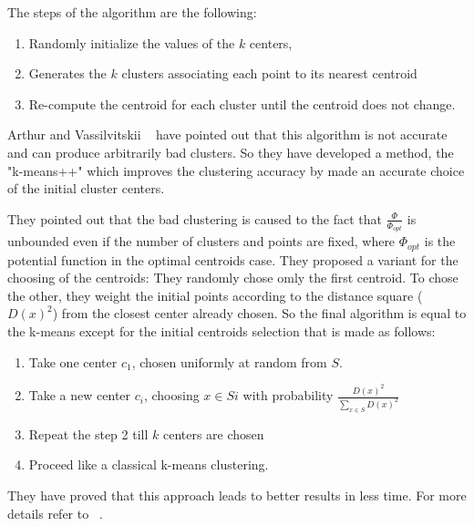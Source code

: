 \documentclass{standalone}
\begin{document}
		The steps of the algorithm are the following: 
		\begin{enumerate}
			\item Randomly initialize the values of the $k$ centers,
			\item Generates the $k$ clusters associating each point to its nearest centroid
			\item Re-compute the centroid for each cluster until the centroid does not change.
			
		\end{enumerate}
		
		Arthur and Vassilvitskii ~\cite{Arthur2007} have pointed out that this algorithm is not accurate and can produce arbitrarily bad clusters. So they have developed a method, the "k-means++" which improves the clustering accuracy by made an accurate choice of the initial cluster centers.
		
		They pointed out that the bad clustering is caused to the fact that $\frac{\Phi}{\Phi_{opt}}$ is unbounded even if the number of clusters and points are fixed, where $\Phi_{opt}$ is the potential function in the optimal centroids case. They proposed a variant for the choosing of the centroids: They randomly chose omly the first centroid. To chose the other, they weight the initial points according to the distance square ($D(x)^2$) from the closest center already chosen. So the final algorithm is equal to the k-means except for the initial centroids selection that is made as follows: 
		\begin{enumerate}
			\item Take one center $c_1$, chosen uniformly at random from $S$.
			
			\item  Take a new center $c_i$, choosing $x \in Si$ with probability $\frac{D(x)^2}{\sum _{x \in S} D(x)^2}$
			
			\item Repeat the step 2 till $k$ centers are chosen
			
			\item Proceed like a classical k-means clustering.
			
		\end{enumerate}
		
		They have proved that this approach leads to better results in less time. For more details refer to ~\cite{Arthur2007}.
\end{document}
